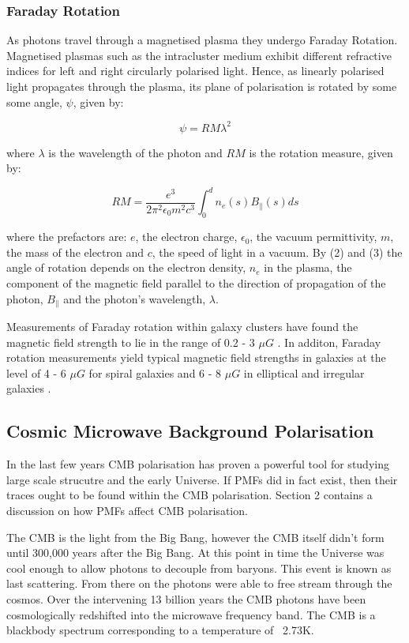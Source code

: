 \subsubsection{Faraday Rotation}

As photons travel through a magnetised plasma they undergo Faraday Rotation. Magnetised plasmas such as the intracluster medium exhibit different refractive indices for left and right circularly polarised light. Hence, as linearly polarised light propagates through the plasma, its plane of polarisation is rotated by some some angle, $\psi$, given by:

\begin{equation}
\label{eqn:beta}
\psi = RM\lambda^2
\end{equation}

where $\lambda$ is the wavelength of the photon and $RM$ is the rotation measure, given by:

\begin{equation}
\label{eqn:RM}
RM = \frac{e^3}{2\pi ^2 \epsilon_0 m^2 c^3}\int_{0}^{d} n_e(s) B_{\|}(s) ds
\end{equation}

where the prefactors are: $e$, the electron charge, $\epsilon_0$, the vacuum permittivity, $m$, the mass of the electron and $c$, the speed of light in a vacuum. By (2) and (3) the angle of rotation depends on the electron density, $n_e$ in the plasma, the component of the magnetic field parallel to the direction of propagation of the photon, $B_{\|}$ and the photon's wavelength, $\lambda$.

Measurements of Faraday rotation within galaxy clusters have found the magnetic field strength to lie in the range of 0.2 - 3 $\mu G$ \cite{Widrow:2002ud}. In additon, Faraday rotation measurements yield typical magnetic field strengths in galaxies at the level of 4 - 6 $\mu G$ for spiral galaxies and 6 - 8 $\mu G$ in elliptical and irregular galaxies \cite{Widrow:2002ud}.

\subsection{Cosmic Microwave Background Polarisation}
In the last few years CMB polarisation has proven a powerful tool for studying large scale strucutre and the early Universe. If PMFs did in fact exist, then their traces ought to be found within the CMB polarisation. Section 2 contains a discussion on how PMFs affect CMB polarisation.

The CMB is the light from the Big Bang, however the CMB itself didn't form until 300,000 years after the Big Bang. At this point in time the Universe was cool enough to allow photons to decouple from baryons. This event is known as last scattering. From there on the photons were able to free stream through the cosmos. Over the intervening 13 billion years the CMB photons have been cosmologically redshifted into the microwave frequency band. The CMB is a blackbody spectrum corresponding to a temperature of ~2.73K.

